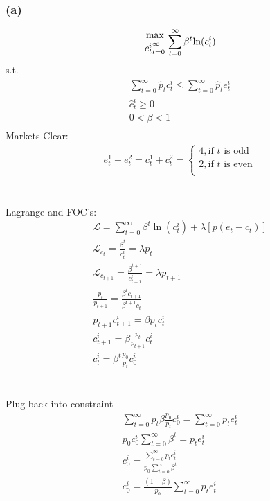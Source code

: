 \documentclass[10pt, a4paper]{article}
\begin{document}
    \subsubsection*{(a)}
      \begin{gather*}
        {\max\atop{c_t^i}_{t=0}^{\infty}}\sum\limits_{t=0}^{\infty}\beta^t\text{ln}(c_t^i)
      \end{gather*}
      s.t.
      \begin{gather*}
        \sum\limits_{t=0}^{\infty}\hat{p}_tc_t^i\leq\sum\limits_{t=0}^{\infty}\hat{p}_te_t^i \\
        \hat{c}_t^i\geq0 \\
        0<\beta<1 \\
      \end{gather*}
      Markets Clear:
      \begin{gather*}
        e_t^1+e_t^2 = c_t^1+c_t^2 = \begin{cases}
          4, \text{if $t$ is odd} \\
          2, \text{if $t$ is even} \\
        \end{cases}
      \end{gather*} \\
      \\
      Lagrange and FOC's: 
      \begin{gather*}
        \mathcal{L} = \sum\limits_{t=0}^{\infty}\beta^t\ln(c_t^i) + \lambda[p(e_t-c_t)] \\
        \mathcal{L}_{c_t} = \frac{\beta^t}{c_t^i} = \lambda p_t \\
        \mathcal{L}_{c_{t+1}} = \frac{\beta^{t+1}}{c_{t+1}^i} = \lambda p_{t+1} \\
        \frac{p_t}{p_{t+1}} = \frac{\beta^tc_{t+1}}{\beta^{t+1}c_t} \\
        p_{t+1}c_{t+1}^i = \beta p_tc_t^i \\
        c_{t+1}^i = \beta\frac{p_t}{p_{t+1}}c_t^i \\
        c_t^i = \beta^t\frac{p_0}{p_t}c_0^i
      \end{gather*} \\
      \\
      Plug back into constraint
      \begin{gather*}
        \sum\limits_{t=0}^{\infty}p_t\beta\frac{p_0}{p_t}c_0^i = \sum\limits_{t=0}^{\infty}p_te_t^i \\
        p_0c_0^i\sum\limits_{t=0}^{\infty}\beta^t = p_te_t^i \\
        c_0^i = \frac{\sum\limits_{t=0}^{\infty}p_te_t^i}{p_0\sum\limits_{t=0}^{\infty}\beta^t} \\
        c_0^i = \frac{(1-\beta)}{p_0}\sum\limits_{t=0}^{\infty}p_te_t^i \\
      \end{gather*} \\
\end{document}
